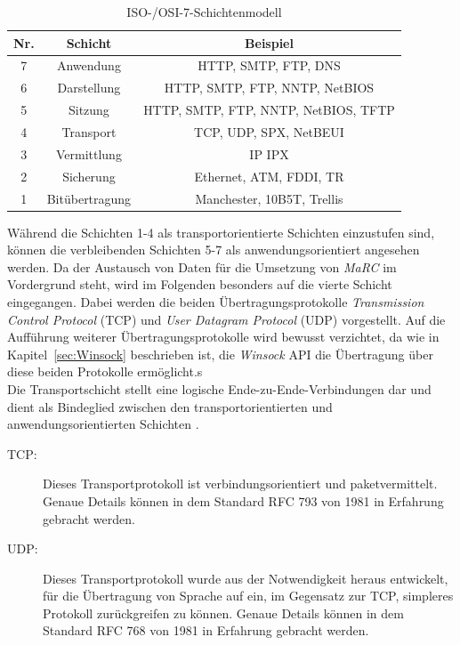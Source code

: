 \begin{table}
	\centering
	\renewcommand{\arraystretch}{1.4}
	\begin{tabular}{|c|c|c|}
		\hline
		\Absatzbox{}
		\textbf{Nr.} & \textbf{Schicht}&\textbf{Beispiel}\\
		\hline
		7 & Anwendung &  HTTP, SMTP, FTP, DNS\\
		\hline
		6 & Darstellung & HTTP, SMTP, FTP, NNTP, NetBIOS\\
		\hline
		5 & Sitzung& HTTP, SMTP, FTP, NNTP, NetBIOS, TFTP\\
		\hline
		4 & Transport & TCP, UDP, SPX, NetBEUI\\
		\hline
		3 & Vermittlung& IP IPX\\
		\hline
		2 & Sicherung & Ethernet, ATM, FDDI, TR\\
		\hline
		1 & Bitübertragung & Manchester, 10B5T, Trellis\\
		\hline
	\end{tabular}
	\caption{ISO-/OSI-7-Schichtenmodell}
	\label{tab:Schichtenmodell}
\end{table}

Während die Schichten 1-4 als transportorientierte Schichten einzustufen sind, können die verbleibenden Schichten 5-7 als anwendungsorientiert angesehen werden. Da der Austausch von Daten für die Umsetzung von \textit{MaRC} im Vordergrund steht, wird im Folgenden besonders auf die vierte Schicht eingegangen. Dabei werden die beiden Übertragungsprotokolle \textit{Transmission Control Protocol} (TCP) und \textit{User Datagram Protocol} (UDP) vorgestellt. Auf die Aufführung weiterer Übertragungsprotokolle wird bewusst verzichtet, da wie in Kapitel~\ref{sec:Winsock} beschrieben ist, die \textit{Winsock} API die Übertragung über diese beiden Protokolle ermöglicht.s\\
Die Transportschicht stellt eine logische Ende-zu-Ende-Verbindungen dar und dient als Bindeglied zwischen den transportorientierten und anwendungsorientierten Schichten \cite{ITU}.

\begin{description}
\item[TCP:] Dieses Transportprotokoll ist verbindungsorientiert und paketvermittelt. Genaue Details können in dem Standard RFC 793 \citep{rfc793} von 1981 in Erfahrung gebracht werden.

\item[UDP:] Dieses Transportprotokoll wurde aus der Notwendigkeit heraus entwickelt, für die Übertragung von Sprache auf ein, im Gegensatz zur TCP, simpleres Protokoll zurückgreifen zu können. Genaue Details können in dem Standard RFC 768 \citep{rfc768} von 1981 in Erfahrung gebracht werden.
\end{description}

